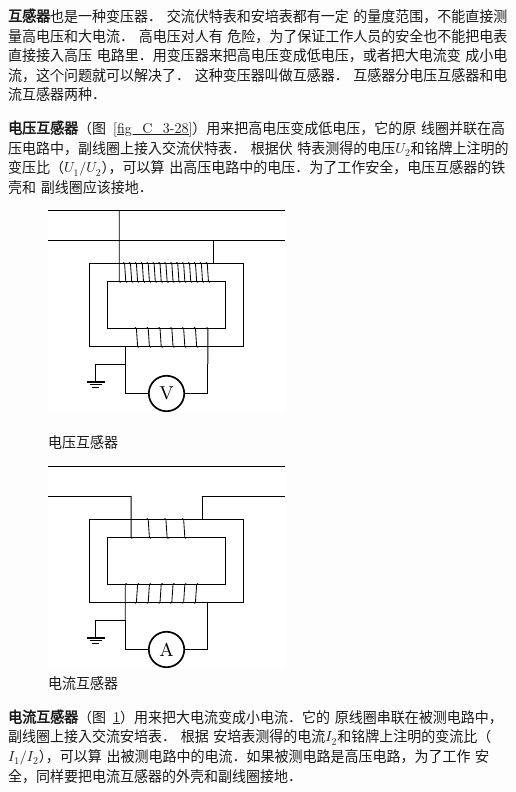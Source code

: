 \textbf{互感器}也是一种变压器．
交流伏特表和安培表都有一定
的量度范围，不能直接测量高电压和大电流．
高电压对人有
危险，为了保证工作人员的安全也不能把电表直接接入高压
电路里．用变压器来把高电压变成低电压，或者把大电流变
成小电流，这个问题就可以解决了．
这种变压器叫做互感器．
互感器分电压互感器和电流互感器两种．

\textbf{电压互感器}（图~\ref{fig_C_3-28}）用来把高电压变成低电压，它的原
线圈并联在高压电路中，副线圈上接入交流伏特表．
根据伏
特表测得的电压$U_2$和铭牌上注明的变压比（$U_1/U_2$），可以算
出高压电路中的电压．为了工作安全，电压互感器的铁壳和
副线圈应该接地．


\begin{figure}[htbp]
    \centering
    \begin{minipage}[t]{0.48\textwidth}
        \centering
        \includegraphics{fig/C/3-28.pdf}
        \caption{电压互感器}\label{fig_C_3-28}
    \end{minipage}
    \begin{minipage}[t]{0.48\textwidth}
        \centering
        \includegraphics{fig/C/3-29.pdf}
        \caption{电流互感器}\label{fig_C_3-29}
    \end{minipage}
\end{figure}

\textbf{电流互感器}（图~\ref{fig_C_3-29}）用来把大电流变成小电流．它的
原线圈串联在被测电路中，副线圈上接入交流安培表．
根据
安培表测得的电流$I_2$和铭牌上注明的变流比（$I_1/I_2$），可以算
出被测电路中的电流．如果被测电路是高压电路，为了工作
安全，同样要把电流互感器的外壳和副线圈接地．


